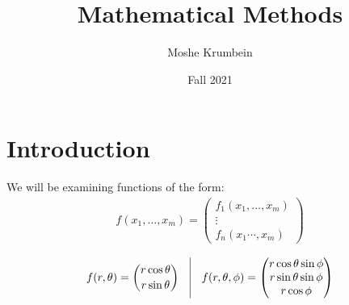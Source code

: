 


\title{Mathematical Methods}
\author{Moshe Krumbein}
\date{Fall 2021}



\section{Introduction}
We will be examining functions of the form:
\begin{gather*}
    f(x_1,\dots,x_m)=\begin{pmatrix}
        f_1(x_1,\dots,x_m) \\ \vdots \\
        f_n(x_1\cdots,x_m)
    \end{pmatrix}
\end{gather*}
\begin{example}
    \begin{gather*}
        f(r,\theta)=\binom{r\cos \theta}{r \sin \theta}
        \quad \vline \quad
        f(r, \theta, \phi)=\begin{pmatrix}
            r \cos \theta \sin \phi \\
            r \sin \theta \sin \phi \\
            r \cos \phi
        \end{pmatrix}
    \end{gather*}
\end{example}
